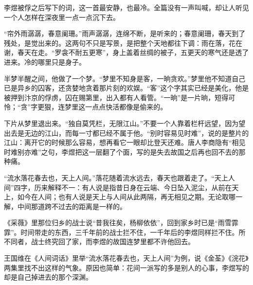 \begin{appreciation}
李煜被俘之后写下的词，这一首最安静，也最冷。全篇没有一声叫喊，却让人听见一个人怎样在深夜里一点一点沉下去。

“帘外雨潺潺，春意阑珊。”雨声潺潺，连绵不断，是听来的；春意阑珊，春天到了残处，是觉出来的。这两句不只是写景，是把整个天地都往下调：雨在落，花在谢，春天在走。“罗衾不耐五更寒”，身上盖着丝绸的被子，五更天的寒气还是透了进来。冷的哪里只是身子。

半梦半醒之间，他做了一个梦。“梦里不知身是客，一晌贪欢。”梦里他不知道自己已是异乡的囚客，还贪婪地贪着那片刻的欢娱。“客”这个字其实已经是美化，他是被押到汴京的俘虏，囚在赐第里，出入都有人看管。“一晌”是一片晌，短得可怜；“贪”字更狠，连梦里这一点点快活都像是偷来的。

下片从梦里退出来。“独自莫凭栏，无限江山。”不要一个人靠着栏杆远望，因为望出去是无边的江山，而每一寸都已经不属于他。“别时容易见时难”，说的是整片的江山：离开它的时候那么容易，想再看它一眼却比登天还难。唐人李商隐有“相见时难别亦难”之句，李煜把这一层翻了个面，写的是失去故国之后再也回不去的那种痛。

“流水落花春去也，天上人间。”落花随着流水远去，春天也跟着走了。“天上人间”四字，历来解释不一：有人说是指昔日身在云端、今日坠入泥尘，从前在天上，如今在人间；也有人说是天上与人间从此两隔，再无相见之期。无论取哪一解，中间那道跨不过去的距离是一样的。

《采薇》里那位归乡的战士说“昔我往矣，杨柳依依”，回到家乡时已是“雨雪霏霏”。时间带走的东西，三千年前的战士拦不住，一千年后的李煜同样拦不住。所不同者，战士终究回了家，而李煜的故国连梦里都不许他回去。

王国维在《人间词话》里举“流水落花春去也，天上人间”为例，说《金荃》《浣花》两集里找不出这样的气象。原因也简单：花间一派写的多是别人的心事，李煜写的却是自己掉进去的那个深渊。
\end{appreciation}

